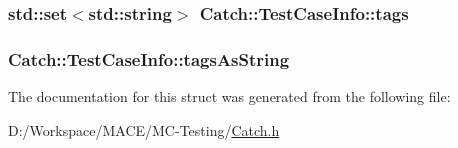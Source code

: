 \subsubsection[{\texorpdfstring{tags}{tags}}]{\setlength{\rightskip}{0pt plus 5cm}std\+::set$<${\bf std\+::string}$>$ Catch\+::\+Test\+Case\+Info\+::tags}\hypertarget{struct_catch_1_1_test_case_info_a045f62e7719a8760a5b456f7fd2dc97c}{}\label{struct_catch_1_1_test_case_info_a045f62e7719a8760a5b456f7fd2dc97c}
\subsubsection[{\texorpdfstring{tags\+As\+String}{tagsAsString}}]{ Catch\+::\+Test\+Case\+Info\+::tags\+As\+String}\hypertarget{struct_catch_1_1_test_case_info_ac65c2d36fd36f71e9bf782b2ea245c64}{}\label{struct_catch_1_1_test_case_info_ac65c2d36fd36f71e9bf782b2ea245c64}


The documentation for this struct was generated from the following file\+:\begin{DoxyCompactItemize}
\item 
D\+:/\+Workspace/\+M\+A\+C\+E/\+M\+C-\/\+Testing/\hyperlink{_catch_8h}{Catch.\+h}\end{DoxyCompactItemize}
